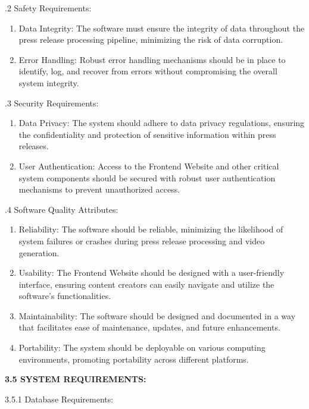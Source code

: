 \documentclass[12pt]{article}
\begin{document}
.2 Safety Requirements:

\begin{enumerate}
\def\labelenumi{\arabic{enumi}.}
\item
    Data Integrity: The software must ensure the integrity of data throughout the press release processing pipeline, minimizing the risk of data corruption.
\item
    Error Handling: Robust error handling mechanisms should be in place to identify, log, and recover from errors without compromising the overall system integrity.
\end{enumerate}

.3 Security Requirements:

\begin{enumerate}
\def\labelenumi{\arabic{enumi}.}
\item
    Data Privacy: The system should adhere to data privacy regulations, ensuring the confidentiality and protection of sensitive information within press releases.
\item 
    User Authentication: Access to the Frontend Website and other critical system components should be secured with robust user authentication mechanisms to prevent unauthorized access.
\end{enumerate}

.4 Software Quality Attributes:
\begin{enumerate}
\def\labelenumi{\arabic{enumi}.}
\item Reliability: The software should be reliable, minimizing the likelihood of system failures or crashes during press release processing and video generation.
\item Usability: The Frontend Website should be designed with a user-friendly interface, ensuring content creators can easily navigate and utilize the software's functionalities.
\item Maintainability: The software should be designed and documented in a way that facilitates ease of maintenance, updates, and future enhancements.
\item Portability: The system should be deployable on various computing environments, promoting portability across different platforms.
    
\end{enumerate}
\pagebreak{}
\justify \fontsize{12}{12} \textbf{3.5 SYSTEM REQUIREMENTS:}
\justify

3.5.1 Database Requirements:
\end{document}
